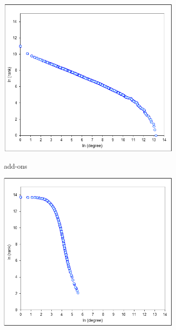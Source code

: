 \documentclass[11pt,oneside]{book}
\begin{document}
\begin{figure}[t]
\centering
\begin{subfigure}[b]{0.49\textwidth}
	\centering
\includegraphics[scale=0.49]{figures/zipf_addon.png} \\
\caption{add-ons} 
\label{fig:power_law_addons}
\end{subfigure}
\begin{subfigure}[b]{0.49\textwidth}
	\centering
\includegraphics[scale=0.49]{figures/zipf-users.png} \\

\end{subfigure}
\end{figure}
\end{document}
